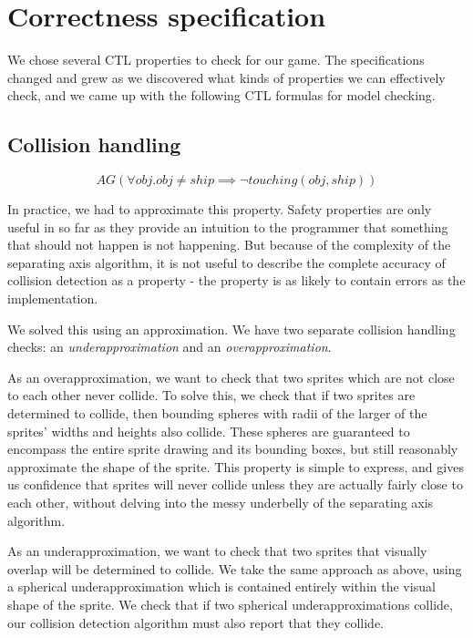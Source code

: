 \documentclass{article}
\begin{document}
\section{Correctness specification}
\label{sec:properties}

    We chose several CTL properties to check for our game. The specifications
    changed and grew as we discovered what kinds of properties we can
    effectively check, and we came up with the following CTL formulas for model
    checking.

    \subsection{Collision handling}

        $$AG(\forall obj. obj \neq ship \implies \lnot touching(obj,ship))$$

        In practice, we had to approximate this property. Safety properties
        are only useful in so far as they provide an intuition to the programmer
        that something that should not happen is not happening. But because of
        the complexity of the separating axis algorithm, it is not useful to
        describe the complete accuracy of collision detection as a property -
        the property is as likely to contain errors as the implementation.

        We solved this using an approximation. We have two separate
        collision handling checks: an \emph{underapproximation} and an
        \emph{overapproximation}.

        As an overapproximation, we want to check that two sprites which are
        not close to each other never collide. To solve this, we check that
        if two sprites are determined to collide, then bounding spheres with
        radii of the larger of the sprites' widths and heights also collide.
        These spheres are guaranteed to encompass the entire sprite drawing and
        its bounding boxes, but still reasonably approximate the shape of the
        sprite. This property is simple to express, and gives us confidence
        that sprites will never collide unless they are actually fairly close
        to each other, without delving into the messy underbelly of the
        separating axis algorithm.

        As an underapproximation, we want to check that two sprites that
        visually overlap will be determined to collide. We take the same
        approach as above, using a spherical underapproximation which is
        contained entirely within the visual shape of the sprite. We check that
        if two spherical underapproximations collide, our collision detection
        algorithm must also report that they collide.
\end{document}
